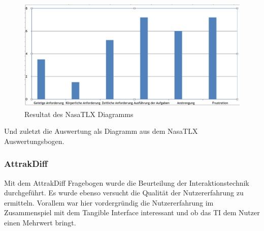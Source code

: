 \documentclass[runningheads,a4paper, 12pt]{llncs}
\begin{document}
\begin{figure}[H]
	\centering
	\includegraphics[angle=0,scale=0.4]{nasatlx_diagram}
	\caption{Resultat des NasaTLX Diagramms}
	\label{fig:result3}
\end{figure}
Und zuletzt die Auswertung als Diagramm aus dem NasaTLX Auswertungsbogen.


\subsubsection{AttrakDiff}
Mit dem AttrakDiff Fragebogen wurde die Beurteilung der Interaktionstechnik durchgeführt. Es wurde ebenso versucht die Qualität der Nutzererfahrung zu ermitteln. Vorallem war hier vordergründig die Nutzererfahrung im Zusammenspiel mit dem Tangible Interface interessant und ob das TI dem Nutzer einen Mehrwert bringt.
\end{document}
